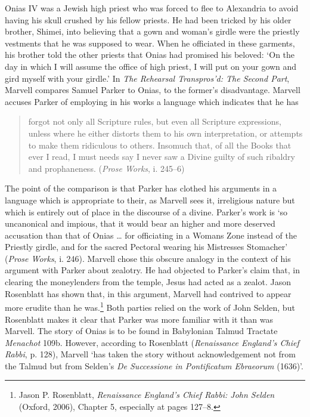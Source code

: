 ﻿\documentclass[12pt]{article}
\newcommand{\citedtitle}[1]{\textit{#1}}
\begin{document}
Onias IV was a Jewish high priest who was
forced to flee to Alexandria to avoid having his skull crushed by his fellow
priests. He had been tricked by his older brother, Shimei, into believing that
a gown and woman’s girdle were the priestly vestments that he was supposed to
wear. When he officiated in these garments, his brother told the other priests
that Onias had promised his beloved: ‘On the day in which I will assume the
office of high priest, I will put on your gown and gird myself with your
girdle.’ In \citedtitle{The Rehearsal Transpros’d: The Second Part}, Marvell compares Samuel Parker to
Onias, to the former’s disadvantage. Marvell accuses Parker of employing in his
works a language which indicates that he has 

\begin{quote}
forgot not only all Scripture rules, but even all Scripture expressions, unless where he either distorts them to his own interpretation, or attempts to make them ridiculous to others. Insomuch that, of all the Books that ever I read, I must needs say I never saw a Divine guilty of such ribaldry and prophaneness. (\citedtitle{Prose Works}, i. 245–6)
\end{quote}

The
point of the comparison is that Parker has clothed his arguments in a language
which is appropriate to their, as Marvell sees it, irreligious nature but which
is entirely out of place in the discourse of a divine. Parker’s work is ‘so
uncanonical and impious, that it would bear an higher and more deserved
accusation than that of Onias … for officiating in a Womans Zone instead of the
Priestly girdle, and for the sacred Pectoral wearing his Mistresses Stomacher’
(\citedtitle{Prose
Works}, i. 246). Marvell chose this obscure analogy in the context of his argument with
Parker about zealotry. He had objected to Parker’s claim that, in clearing the
moneylenders from the temple, Jesus had acted as a zealot. Jason Rosenblatt has
shown that, in this argument, Marvell had contrived to appear more erudite than
he was.\footnote{Jason P. Rosenblatt, \citedtitle{Renaissance England’s Chief Rabbi: John Selden} (Oxford, 2006), Chapter 5, especially at pages 127–8.}
Both parties relied on the work of John Selden, but Rosenblatt makes it clear
that Parker was more familiar with it than was Marvell. The story of Onias is
to be found in Babylonian Talmud Tractate \citedtitle{Menachot} 109b. However,
according to Rosenblatt (\citedtitle{Renaissance England’s Chief Rabbi}, p. 128), Marvell ‘has
taken the story without acknowledgement not from the Talmud but from Selden’s \citedtitle{De
Successione in Pontificatum Ebraeorum} (1636)’.
\end{document}
